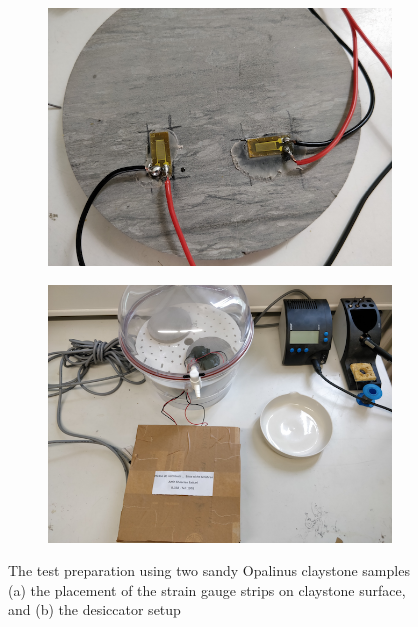 \begin{figure}[!ht]
\begin{subfigure}[c]{0.48\textwidth}
\includegraphics[width=1\textwidth]{figures/Amir_Shrinkage_Sensors.png}
\subcaption{}
\label{fig:Amir_Shrinkage_Sensors}
\end{subfigure}
\hfill
\begin{subfigure}[c]{0.48\textwidth}
\includegraphics[width=1\textwidth]{figures/Amir_Shrinkage_Full_Setup.png}
\subcaption{}
\label{fig:Amir_Shrinkage_Full_Setup}
\end{subfigure}
\caption{The test preparation using two sandy Opalinus claystone samples (a) the placement of the strain gauge strips on claystone surface, and (b) the desiccator setup}
\end{figure}

